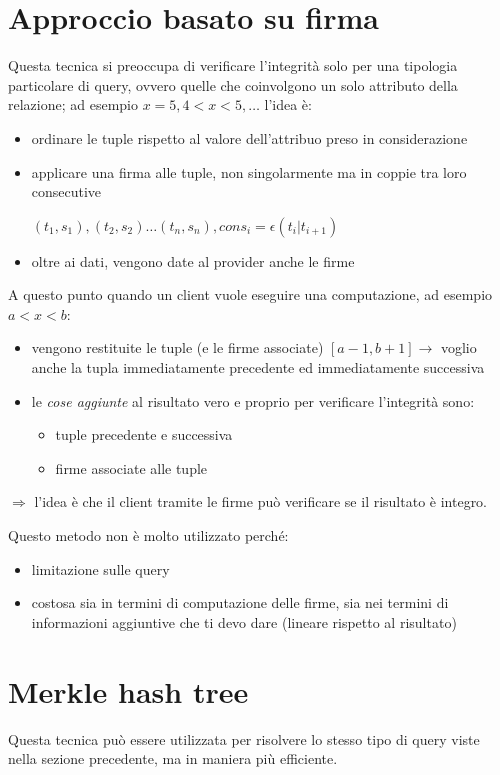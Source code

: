 \documentclass{report}
\begin{document}
\section{Approccio basato su firma}

Questa tecnica si preoccupa di verificare l'integrità solo per una tipologia
particolare di query, ovvero quelle che coinvolgono un solo attributo 
della relazione; ad esempio $x=5, 4<x<5,\dots$ l'idea è:
\begin{itemize}
    \item ordinare le tuple rispetto al valore dell'attribuo preso in considerazione 
    \item applicare una firma alle tuple, non singolarmente ma in coppie tra loro consecutive 
    
    $(t_1,s_1),(t_2,s_2)\dots(t_n,s_n), con s_i = \epsilon(t_i | t_{i+1})$ 
    \item oltre ai dati, vengono date al provider anche le firme
\end{itemize}

\noindent A questo punto quando un client vuole eseguire una computazione, ad esempio 
$a<x<b$:
\begin{itemize}
    \item vengono restituite le tuple (e le firme associate) $[a-1,b+1] \rightarrow$ voglio anche la tupla 
    immediatamente precedente ed immediatamente successiva 
    \item le \textit{cose aggiunte} al risultato vero e proprio per verificare l'integrità sono: 
    \begin{itemize}
        \item tuple precedente e successiva 
        \item firme associate alle tuple 
    \end{itemize}
\end{itemize} 

\noindent $\Rightarrow$ l'idea è che il client tramite le firme può verificare se il risultato è integro.

\noindent Questo metodo non è molto utilizzato perché:
\begin{itemize}
    \item limitazione sulle query
    \item costosa sia in termini di computazione delle firme, sia nei termini di informazioni 
    aggiuntive che ti devo dare (lineare rispetto al risultato)
\end{itemize}


\section{Merkle hash tree}
Questa tecnica può essere utilizzata per risolvere lo stesso tipo di query viste 
nella sezione precedente, ma in maniera più efficiente. 
\end{document}
